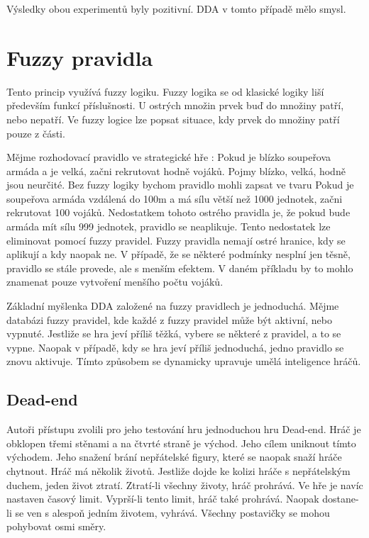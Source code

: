 Výsledky obou experimentů byly pozitivní. DDA v tomto případě mělo smysl.

\section{Fuzzy pravidla} \label{sec:fuzzy}

Tento princip využívá fuzzy logiku. Fuzzy logika se od klasické logiky liší především funkcí příslušnosti. U ostrých množin prvek buď do množiny patří, nebo nepatří. Ve fuzzy logice lze popsat situace, kdy prvek do množiny patří pouze z části.

Mějme rozhodovací pravidlo ve strategické hře : Pokud je blízko soupeřova armáda a je velká, začni rekrutovat hodně vojáků. Pojmy blízko, velká, hodně jsou neurčité. Bez fuzzy logiky bychom pravidlo mohli zapsat ve tvaru Pokud je soupeřova armáda vzdálená do 100m a má sílu větší než 1000 jednotek, začni rekrutovat 100 vojáků. Nedostatkem tohoto ostrého pravidla je, že pokud bude armáda mít sílu 999 jednotek, pravidlo se neaplikuje. Tento nedostatek lze eliminovat pomocí fuzzy pravidel. Fuzzy pravidla nemají ostré hranice, kdy se aplikují a kdy naopak ne. V případě, že se některé podmínky nesplní jen těsně, pravidlo se stále provede, ale s menším efektem. V daném příkladu by to mohlo znamenat pouze vytvoření menšího počtu vojáků.

Základní myšlenka DDA založené na fuzzy pravidlech je jednoduchá. Mějme databázi fuzzy pravidel, kde každé z fuzzy pravidel může být aktivní, nebo vypnuté. Jestliže se hra jeví příliš těžká, vybere se některé z pravidel, a to se vypne. Naopak v případě, kdy se hra jeví příliš jednoduchá, jedno pravidlo se znovu aktivuje. Tímto způsobem se dynamicky upravuje umělá inteligence hráčů.

\subsection{Dead-end}

Autoři přístupu zvolili pro jeho testování hru jednoduchou hru Dead-end.\cite{25deadend} Hráč je obklopen třemi stěnami a na čtvrté straně je východ. Jeho cílem uniknout tímto východem. Jeho snažení brání nepřátelské figury, které se naopak snaží hráče chytnout. Hráč má několik životů. Jestliže dojde ke kolizi hráče s nepřátelským duchem, jeden život ztratí. Ztratí-li všechny životy, hráč prohrává. Ve hře je navíc nastaven časový limit. Vyprší-li tento limit, hráč také prohrává. Naopak dostane-li se ven s alespoň jedním životem, vyhrává. Všechny postavičky se mohou pohybovat osmi směry.

